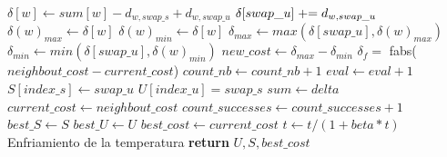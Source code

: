 \begin{algorithm}[H]
\begin{algorithmic}
            \State
                    \State $\delta[w] \gets sum[w] - d_{w,swap\_s} + d_{w,swap\_u}$
                    \State $\delta[swap\_u] \mathrel{+}= d_{w,swap\_u}$
                    \State
                        \State $\delta(w)_{max} \gets \delta[w]$
                    \EndIf
                        \State $\delta(w)_{min} \gets \delta[w]$
                    \EndIf
                \EndIf
            \EndFor
            \State
            \State $\delta_{max} \gets max(\delta[swap\_u], \delta(w)_{max})$
            \State $\delta_{min} \gets min(\delta[swap\_u], \delta(w)_{min})$
            \State $new\_cost \gets \delta_{max} - \delta_{min}$
            \State
            \State $\delta_f =$ fabs($neighbout\_cost - current\_cost$)
            \State $count\_nb \leftarrow count\_nb + 1$
            \State $eval \leftarrow eval + 1$
            \State
                \State $S[index\_s] \leftarrow swap\_u$
                \State $U[index\_u] = swap\_s$
                \State $sum \leftarrow delta$
                \State $current\_cost \leftarrow neighbout\_cost$
                \State $count\_successes \leftarrow count\_successes + 1$
                \State
                    \State $best\_S \leftarrow S$
                    \State $best\_U \leftarrow U$
                    \State $best\_cost \leftarrow current\_cost$
                \EndIf
                \State
            \EndIf 
        \EndWhile
        \State $t \leftarrow t/(1+beta*t)$ \Comment Enfriamiento de la temperatura
        \State
    \EndWhile
    \State
    \State \textbf{return} $U, S, best\_cost$  
\EndProcedure
\end{algorithmic}
\end{algorithm}


